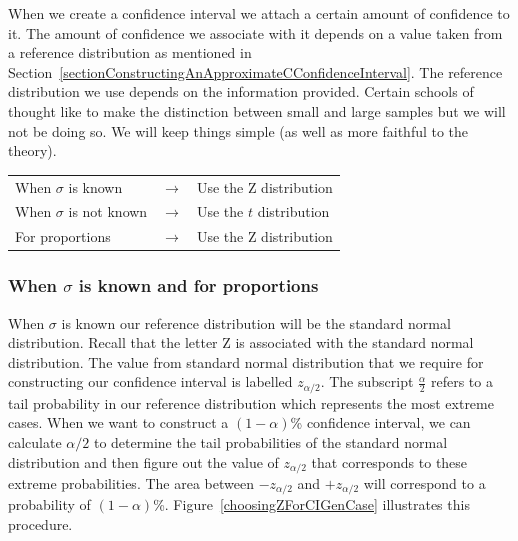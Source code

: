 When we create a confidence interval we attach a certain amount of confidence to it.
The amount of confidence we associate with it depends on a value taken from a reference distribution
as mentioned in Section~\ref{sectionConstructingAnApproximateCConfidenceInterval}.
The reference distribution we use depends on the information provided.
Certain schools of thought like to make the distinction between small and large samples but we will not be doing so.
We will keep things simple (as well as more faithful to the theory).


\begin{termBox}{

\begin{tabular}{l c l}
When $\sigma$ is known		&	$\longrightarrow$	&	Use the Z distribution	\\
When $\sigma$ is not known	&	$\longrightarrow$	&	Use the $t$ distribution		\\
For proportions				&	$\longrightarrow$	&	Use the Z distribution
\end{tabular}
}
\end{termBox}


\subsubsection{When $\sigma$ is known and for proportions}
\label{sectionCIWhenSigmaKnown}


When $\sigma$ is known our reference distribution will be the standard normal distribution.
Recall that the letter Z is associated with the standard normal distribution.
The value from standard normal distribution that we require for constructing our confidence interval
is labelled $z_{\alpha/2}$.
The subscript $\frac{\alpha}{2}$ refers to a tail probability in our reference distribution which represents the most extreme cases. 
When we want to construct a $(1 - \alpha)$\% confidence interval, we can calculate $\alpha/2$ to 
determine the tail probabilities of the standard normal distribution and then figure out the value
of $z_{\alpha/2}$ that corresponds to these extreme probabilities.
The area between $-z_{\alpha/2}$ and $+z_{\alpha/2}$ will correspond to a probability of $(1-\alpha)$\%.
Figure~\ref{choosingZForCIGenCase} illustrates this procedure.

